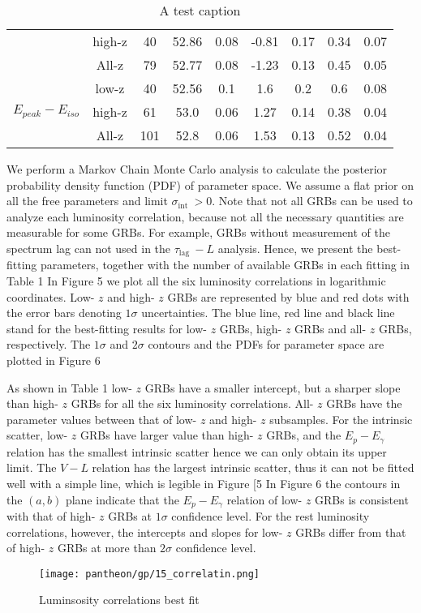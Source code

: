 \begin{table}
\begin{tabular}{|c|c|c|c|c|c|c|c|c|}
\cline{2-9}
 & high-z & 40 & 52.86 & 0.08 & -0.81 & 0.17 & 0.34 & 0.07\\
\cline{2-9}
 & All-z & 79 & 52.77 & 0.08 & -1.23 & 0.13 & 0.45 & 0.05\\
\hline
\multirow{3}{*}{$E_{peak}-E_{iso}$} & low-z & 40 & 52.56 & 0.1 & 1.6 & 0.2 & 0.6 & 0.08\\
\cline{2-9}
 & high-z & 61 & 53.0 & 0.06 & 1.27 & 0.14 & 0.38 & 0.04\\
\cline{2-9}
 & All-z & 101 & 52.8 & 0.06 & 1.53 & 0.13 & 0.52 & 0.04\\
\hline
\end{tabular}
\caption{A test caption}
\label{table_pantheon_gp}
\end{table}

We perform a Markov Chain Monte Carlo analysis to calculate the posterior probability density function (PDF) of parameter space. We assume a flat prior on all the free parameters and limit $\sigma_{\text {int }}>0$. Note that not all GRBs can be used to analyze each luminosity correlation, because not all the necessary quantities are measurable for some GRBs. For example, GRBs without measurement of the spectrum lag can not used in the $\tau_{\text {lag }}-L$ analysis. Hence, we present the best-fitting parameters, together with the number of available GRBs in each fitting in Table 1 In Figure 5 we plot all the six luminosity correlations in logarithmic coordinates. Low- $z$ and high- $z$ GRBs are represented by blue and red dots with the error bars denoting $1 \sigma$ uncertainties. The blue line, red line and black line stand for the best-fitting results for low- $z$ GRBs, high- $z$ GRBs and all- $z$ GRBs, respectively. The $1 \sigma$ and $2 \sigma$ contours and the PDFs for parameter space are plotted in Figure 6

As shown in Table 1 low- $z$ GRBs have a smaller intercept, but a sharper slope than high- $z$ GRBs for all the six luminosity correlations. All- $z$ GRBs have the parameter values between that of low- $z$ and high- $z$ subsamples. For the intrinsic scatter, low- $z$ GRBs have larger value than high- $z$ GRBs, and the $E_{p}-E_{\gamma}$ relation has the smallest intrinsic scatter hence we can only obtain its upper limit. The $V-L$ relation has the largest intrinsic scatter, thus it can not be fitted well with a simple line, which is legible in Figure [5 In Figure 6 the contours in the $(a, b)$ plane indicate that the $E_{p}-E_{\gamma}$ relation of low- $z$ GRBs is consistent with that of high- $z$ GRBs at $1 \sigma$ confidence level. For the rest luminosity correlations, however, the intercepts and slopes for low- $z$ GRBs differ from that of high- $z$ GRBs at more than $2 \sigma$ confidence level.

\begin{figure}[H]
	\centering
	\texttt{[image: pantheon/gp/15\_correlatin.png]}
	\caption{Luminsosity correlations best fit}
	\label{fig:correlation_gp}
\end{figure}
